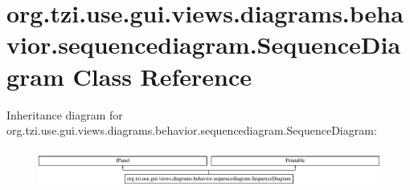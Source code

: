\hypertarget{classorg_1_1tzi_1_1use_1_1gui_1_1views_1_1diagrams_1_1behavior_1_1sequencediagram_1_1_sequence_diagram}{\section{org.\-tzi.\-use.\-gui.\-views.\-diagrams.\-behavior.\-sequencediagram.\-Sequence\-Diagram Class Reference}
\label{classorg_1_1tzi_1_1use_1_1gui_1_1views_1_1diagrams_1_1behavior_1_1sequencediagram_1_1_sequence_diagram}
}
Inheritance diagram for org.\-tzi.\-use.\-gui.\-views.\-diagrams.\-behavior.\-sequencediagram.\-Sequence\-Diagram\-:\begin{figure}[H]
\begin{center}
\leavevmode
\includegraphics[height=1.230769cm]{classorg_1_1tzi_1_1use_1_1gui_1_1views_1_1diagrams_1_1behavior_1_1sequencediagram_1_1_sequence_diagram}
\end{center}
\end{figure}
